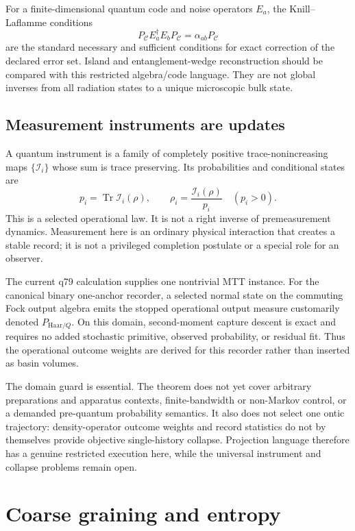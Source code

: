 \documentclass[11pt]{article}
\DeclareMathOperator{\Tr}{Tr}
\newcommand{\cC}{\mathcal C}
\newcommand{\cI}{\mathcal I}
\begin{document}
For a finite-dimensional quantum code and noise operators $E_a$, the
Knill--Laflamme conditions~\cite{KnillLaflamme1997}
\[
 P_{\cC}E_a^\dagger E_bP_{\cC}=\alpha_{ab}P_{\cC}
\]
are the standard necessary and sufficient conditions for exact correction of the
declared error set. Island and entanglement-wedge reconstruction should be compared
with this restricted algebra/code language. They are not global inverses from all
radiation states to a unique microscopic bulk state.

\subsection{Measurement instruments are updates}

A quantum instrument is a family of completely positive trace-nonincreasing maps
$\{\cI_i\}$ whose sum is trace preserving. Its probabilities and conditional states
are
\[
 p_i=\Tr\cI_i(\rho),\qquad
 \rho_i=\frac{\cI_i(\rho)}{p_i}\quad(p_i>0).
\]
This is a selected operational law. It is not a right inverse of premeasurement
dynamics. Measurement here is an ordinary physical interaction that creates a stable
record; it is not a privileged completion postulate or a special role for an
observer.

The current q79 calculation supplies one nontrivial MTT instance. For the canonical
binary one-anchor recorder, a selected normal state on the commuting Fock output
algebra emits the stopped operational output measure customarily denoted
$P_{\mathrm{Haar}/Q}$. On this domain, second-moment capture descent is exact and
requires no added stochastic primitive, observed probability, or residual fit. Thus
the operational outcome weights are derived for this recorder rather than inserted as
basin volumes.

The domain guard is essential. The theorem does not yet cover arbitrary preparations
and apparatus contexts, finite-bandwidth or non-Markov control, or a demanded
pre-quantum probability semantics. It also does not select one ontic trajectory:
density-operator outcome weights and record statistics do not by themselves provide
objective single-history collapse. Projection language therefore has a genuine
restricted execution here, while the universal instrument and collapse problems
remain open.

\section{Coarse graining and entropy}
\end{document}
